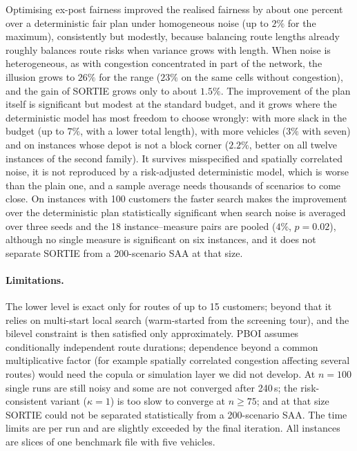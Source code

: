 \documentclass[11pt]{article}
\theoremstyle{definition}
\begin{document}
Optimising ex-post fairness improved the realised fairness by about one
percent over a deterministic fair plan under homogeneous noise (up to $2\%$
for the maximum), consistently but modestly, because balancing route lengths already roughly balances
route risks when variance grows with length.
When noise is heterogeneous, as with
congestion concentrated in part of the network, the illusion grows to
$26\%$ for the range ($23\%$ on the same cells without congestion), and the
gain of SORTIE grows only to about $1.5\%$.
The improvement of the plan itself is significant but modest at the standard
budget, and it grows where the deterministic model has most freedom to choose
wrongly: with more slack in the budget (up to $7\%$, with a lower total
length), with more vehicles ($3\%$ with seven) and on instances whose depot is
not a block corner ($2.2\%$, better on all twelve instances of the second
family). It survives misspecified and spatially correlated noise, it is not
reproduced by a risk-adjusted deterministic model, which is worse than the
plain one, and a sample average needs thousands of scenarios to come close.
On instances with 100 customers the faster search makes the improvement
over the deterministic plan statistically significant when search noise is
averaged over three seeds and the 18 instance--measure pairs are pooled
($4\%$, $p=0.02$), although no single measure is significant on six
instances, and it does not separate SORTIE from a 200-scenario SAA at that
size.

\paragraph{Limitations.} The lower level is exact only for routes of up to 15
customers; beyond that it relies on multi-start local search (warm-started
from the screening tour), and the bilevel constraint is then satisfied only
approximately. PBOI assumes conditionally independent route durations;
dependence beyond a common multiplicative factor (for example spatially
correlated congestion affecting several routes) would need the copula or
simulation layer we did not develop. At $n=100$ single runs are still noisy
and some are not converged after 240\,s; the risk-consistent variant
($\kappa=1$) is too slow to converge at $n\ge75$; and at that size SORTIE could
not be separated statistically from a 200-scenario SAA. The time limits are
per run and are slightly exceeded by the final iteration. All instances are
slices of one benchmark file with five vehicles.
\end{document}
